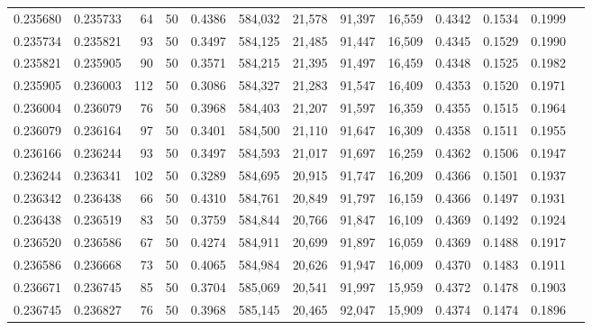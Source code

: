 \begin{tabular}{rrrrrrrrrrrrr}
0.235680 & 0.235733 &    64 &  50 &                                     0.4386 & 584,032 &  21,578 &  91,397 &  16,559 & 0.4342 & 0.1534 & 0.1999 \\
0.235734 & 0.235821 &    93 &  50 &                                     0.3497 & 584,125 &  21,485 &  91,447 &  16,509 & 0.4345 & 0.1529 & 0.1990 \\
0.235821 & 0.235905 &    90 &  50 &                                     0.3571 & 584,215 &  21,395 &  91,497 &  16,459 & 0.4348 & 0.1525 & 0.1982 \\
0.235905 & 0.236003 &   112 &  50 &                                     0.3086 & 584,327 &  21,283 &  91,547 &  16,409 & 0.4353 & 0.1520 & 0.1971 \\
0.236004 & 0.236079 &    76 &  50 &                                     0.3968 & 584,403 &  21,207 &  91,597 &  16,359 & 0.4355 & 0.1515 & 0.1964 \\
0.236079 & 0.236164 &    97 &  50 &                                     0.3401 & 584,500 &  21,110 &  91,647 &  16,309 & 0.4358 & 0.1511 & 0.1955 \\
0.236166 & 0.236244 &    93 &  50 &                                     0.3497 & 584,593 &  21,017 &  91,697 &  16,259 & 0.4362 & 0.1506 & 0.1947 \\
0.236244 & 0.236341 &   102 &  50 &                                     0.3289 & 584,695 &  20,915 &  91,747 &  16,209 & 0.4366 & 0.1501 & 0.1937 \\
0.236342 & 0.236438 &    66 &  50 &                                     0.4310 & 584,761 &  20,849 &  91,797 &  16,159 & 0.4366 & 0.1497 & 0.1931 \\
0.236438 & 0.236519 &    83 &  50 &                                     0.3759 & 584,844 &  20,766 &  91,847 &  16,109 & 0.4369 & 0.1492 & 0.1924 \\
0.236520 & 0.236586 &    67 &  50 &                                     0.4274 & 584,911 &  20,699 &  91,897 &  16,059 & 0.4369 & 0.1488 & 0.1917 \\
0.236586 & 0.236668 &    73 &  50 &                                     0.4065 & 584,984 &  20,626 &  91,947 &  16,009 & 0.4370 & 0.1483 & 0.1911 \\
0.236671 & 0.236745 &    85 &  50 &                                     0.3704 & 585,069 &  20,541 &  91,997 &  15,959 & 0.4372 & 0.1478 & 0.1903 \\
0.236745 & 0.236827 &    76 &  50 &                                     0.3968 & 585,145 &  20,465 &  92,047 &  15,909 & 0.4374 & 0.1474 & 0.1896 \\

\end{tabular}
